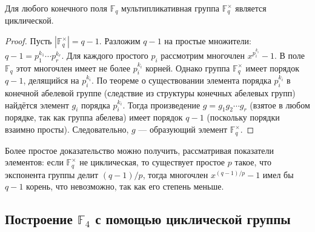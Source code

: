 \documentclass[10pt]{article}
\begin{document}
\begin{theorem}
Для любого конечного поля $\mathbb{F}_{q}$ мультипликативная группа $\mathbb{F}_{q}^{\times}$ является циклической.
\end{theorem}

\begin{proof}
Пусть $|\mathbb{F}_{q}^{\times}| = q-1$. Разложим $q-1$ на простые множители: $q-1 = p_1^{k_1} \cdots p_r^{k_r}$. Для каждого простого $p_i$ рассмотрим многочлен $x^{p_i^{k_i}} - 1$. В поле $\mathbb{F}_{q}$ этот многочлен имеет не более $p_i^{k_i}$ корней. Однако группа $\mathbb{F}_{q}^{\times}$ имеет порядок $q-1$, делящийся на $p_i^{k_i}$. По теореме о существовании элемента порядка $p_i^{k_i}$ в конечной абелевой группе (следствие из структуры конечных абелевых групп) найдётся элемент $g_i$ порядка $p_i^{k_i}$. Тогда произведение $g = g_1 g_2 \cdots g_r$ (взятое в любом порядке, так как группа абелева) имеет порядок $q-1$ (поскольку порядки взаимно просты). Следовательно, $g$ — образующий элемент $\mathbb{F}_{q}^{\times}$.
\end{proof}

\begin{remark}
Более простое доказательство можно получить, рассматривая показатели элементов: если $\mathbb{F}_{q}^{\times}$ не циклическая, то существует простое $p$ такое, что экспонента группы делит $(q-1)/p$, тогда многочлен $x^{(q-1)/p}-1$ имел бы $q-1$ корень, что невозможно, так как его степень меньше.
\end{remark}

\subsection{Построение $\mathbb{F}_4$ с помощью циклической группы}
\end{document}
